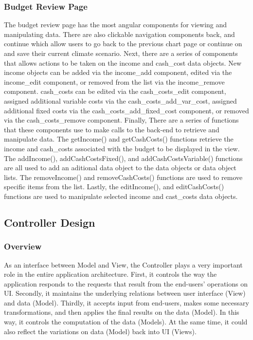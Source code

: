 \documentclass[onecolumn, draftclsnofoot,10pt, compsoc]{article}
\begin{document}
		\subsubsection{Budget Review Page}
		The budget review page has the most angular components for viewing and manipulating data. There are also clickable navigation components back, and continue which allow users to go back to the previous chart page or continue on and save their current climate scenario. Next, there are a series of components that allows actions to be taken on the income and cash\_cost data objects. New income objects can be added via the income\_add component, edited via the income\_edit component, or removed from the list via the income\_remove component. cash\_costs can be edited via the cash\_costs\_edit component, assigned additional variable costs via the cash\_costs\_add\_var\_cost, assigned additional fixed costs via the cash\_costs\_add\_fixed\_cost component, or removed via the cash\_costs\_remove component. Finally, There are a series of functions that these components use to make calls to the back-end to retrieve and manipulate data. The getIncome() and getCashCosts() functions retrieve the income and cash\_costs associated with the budget to be displayed in the view. The addIncome(), addCashCostsFixed(), and addCashCostsVariable() functions are all used to add an aditional data object to the data objects or data object lists. The removeIncome() and removeCashCosts() functions are used to remove specific items from the list. Lastly, the editIncome(), and editCashCosts() functions are used to manipulate selected income and cast\_costs data objects.\\
		

	\subsection{Controller Design}
			\subsubsection{Overview}
			As an interface between Model and View, the Controller plays a very important role in the entire application architecture. First, it controls the way the application responds to the requests that result from the end-users' operations on UI. Secondly, it maintains the underlying relations between user interface (View) and data (Model). Thirdly, it accepts input from end-users, makes some necessary transformations, and then applies the final results on the data (Model). In this way, it controls the computation of the data (Models). At the same time, it could also reflect the variations on data (Model) back into UI (Views). \\
\end{document}
